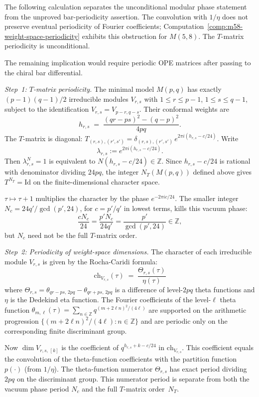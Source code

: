\begin{evidence}
The following calculation separates the unconditional modular phase
statement from the unproved bar-periodicity assertion.  The convolution
with $1/\eta$ does not preserve eventual periodicity of Fourier
coefficients; Computation~\ref{comp:m58-weight-space-periodicity}
exhibits this obstruction for $M(5,8)$. The $T$-matrix periodicity is
unconditional.

\smallskip\noindent
The remaining implication would require periodic OPE matrices after
passing to the chiral bar differential.

\emph{Step~1: $T$-matrix periodicity.}
The minimal model $M(p,q)$ has exactly $(p-1)(q-1)/2$ irreducible modules
$V_{r,s}$ with $1 \leq r \leq p-1$, $1 \leq s \leq q-1$, subject to the
identification $V_{r,s} = V_{p-r,q-s}$. Their conformal weights are
\[
h_{r,s} \;=\; \frac{(qr - ps)^2 - (q-p)^2}{4pq}.
\]
The $T$-matrix is diagonal: $T_{(r,s),(r',s')} = \delta_{(r,s),(r',s')}
\, e^{2\pi i(h_{r,s} - c/24)}$. Write
\[
\lambda_{r,s} := e^{2\pi i(h_{r,s} - c/24)}.
\]
Then $\lambda_{r,s}^N = 1$ is equivalent to
$N(h_{r,s} - c/24) \in \mathbb{Z}$. Since $h_{r,s} - c/24$ is rational
with denominator dividing $24pq$, the integer $N_T(M(p,q))$ defined
above gives $T^{N_T}=\mathrm{Id}$ on the finite-dimensional character
space.

$\tau \mapsto \tau + 1$ multiplies the character by the phase
$e^{-2\pi i c/24}$. The smaller integer
$N_c=24q'/\gcd(p',24)$, for $c=p'/q'$ in lowest terms, kills this
vacuum phase:
\[
\frac{cN_c}{24} = \frac{p'N_c}{24q'} = \frac{p'}{\gcd(p',24)} \in \mathbb{Z},
\]
but $N_c$ need not be the full $T$-matrix order.

\emph{Step~2: Periodicity of weight-space dimensions.}
The character of each irreducible module $V_{r,s}$ is given by the
Rocha-Caridi formula:
\[
\mathrm{ch}_{V_{r,s}}(\tau) \;=\; \frac{\Theta_{r,s}(\tau)}{\eta(\tau)}
\]
where $\Theta_{r,s} = \theta_{qr-ps,\,2pq} - \theta_{qr+ps,\,2pq}$ is a
difference of level-$2pq$ theta functions and $\eta$ is the Dedekind eta
function. The Fourier coefficients of the level-$\ell$ theta function
$\theta_{m,\ell}(\tau) = \sum_{n \in \mathbb{Z}} q^{(m + 2\ell n)^2/(4\ell)}$
are supported on the arithmetic progression $\{(m + 2\ell n)^2/(4\ell) : n \in \mathbb{Z}\}$
and are periodic only on the corresponding finite discriminant group.

Now $\dim V_{r,s,\,[k]}$ is the coefficient of $q^{h_{r,s} + k - c/24}$ in
$\mathrm{ch}_{V_{r,s}}$. This coefficient equals the convolution of the
theta-function coefficients with the partition function $p(\cdot)$
(from $1/\eta$). The theta-function numerator $\Theta_{r,s}$ has exact
period dividing $2pq$ on the discriminant group. This numerator
period is separate from both the vacuum phase period $N_c$ and the
full $T$-matrix order~$N_T$.


\end{evidence}
